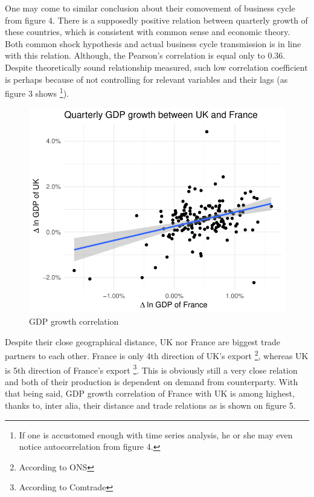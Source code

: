 \documentclass{article}
\begin{document}
One may come to similar conclusion about their comovement of business cycle from figure 4. There is a supposedly positive relation between quarterly growth of these countries, which is consistent with common sense and economic theory. Both common shock hypothesis and actual business cycle transmission is in line with this relation. Although, the Pearson's correlation is equal only to 0.36. Despite theoretically sound relationship measured, such low correlation coefficient is perhaps because of not controlling for relevant variables and their lags (as figure 3 shows \footnote[7]{If one is accustomed enough with time series analysis, he or she may even notice autocorrelation from figure 4.}).

\begin{figure}[ht]
\centering
\includegraphics[scale=0.8]{graphs/gdp_fr_uk.pdf}
\caption{GDP growth correlation}
\end{figure}

Despite their close geographical distance, UK nor France are biggest trade partners to each other. France is only 4th direction of UK's export \footnote[8]{According to ONS}, whereas UK is 5th direction of France's export \footnote[9]{ According to Comtrade}. This is obviously still a very close relation and both of their production is dependent on demand from counterparty. With that being said, GDP growth correlation of France with UK is among highest, thanks to, inter alia, their distance and trade relations as is shown on figure 5. 
\end{document}
